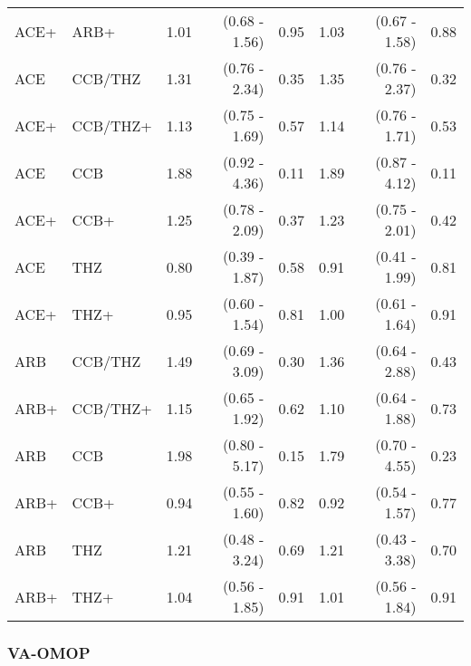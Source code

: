 \documentclass[11pt,]{article}
\begin{document}
\begin{table}[H]
{\begin{tabular}{llrrrrrr}
  ACE+ & ARB+ & 1.01 & (0.68 - 1.56) & 0.95 & 1.03 & (0.67 - 1.58) & 0.88 \\ 
  ACE & CCB/THZ & 1.31 & (0.76 - 2.34) & 0.35 & 1.35 & (0.76 - 2.37) & 0.32 \\ 
  ACE+ & CCB/THZ+ & 1.13 & (0.75 - 1.69) & 0.57 & 1.14 & (0.76 - 1.71) & 0.53 \\ 
  ACE & CCB & 1.88 & (0.92 - 4.36) & 0.11 & 1.89 & (0.87 - 4.12) & 0.11 \\ 
  ACE+ & CCB+ & 1.25 & (0.78 - 2.09) & 0.37 & 1.23 & (0.75 - 2.01) & 0.42 \\ 
  ACE & THZ & 0.80 & (0.39 - 1.87) & 0.58 & 0.91 & (0.41 - 1.99) & 0.81 \\ 
  ACE+ & THZ+ & 0.95 & (0.60 - 1.54) & 0.81 & 1.00 & (0.61 - 1.64) & 0.91 \\ 
  ARB & CCB/THZ & 1.49 & (0.69 - 3.09) & 0.30 & 1.36 & (0.64 - 2.88) & 0.43 \\ 
  ARB+ & CCB/THZ+ & 1.15 & (0.65 - 1.92) & 0.62 & 1.10 & (0.64 - 1.88) & 0.73 \\ 
  ARB & CCB & 1.98 & (0.80 - 5.17) & 0.15 & 1.79 & (0.70 - 4.55) & 0.23 \\ 
  ARB+ & CCB+ & 0.94 & (0.55 - 1.60) & 0.82 & 0.92 & (0.54 - 1.57) & 0.77 \\ 
  ARB & THZ & 1.21 & (0.48 - 3.24) & 0.69 & 1.21 & (0.43 - 3.38) & 0.70 \\ 
  ARB+ & THZ+ & 1.04 & (0.56 - 1.85) & 0.91 & 1.01 & (0.56 - 1.84) & 0.91 \\ 
    \bottomrule
  \end{tabular}
  }
\end{table}

\hypertarget{va-omop-2}{%
\subsubsection{VA-OMOP}\label{va-omop-2}}
\end{document}
